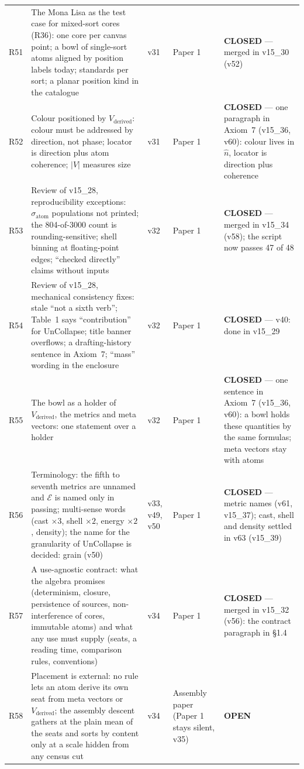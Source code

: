 \documentclass[11pt]{article}
\begin{document}
\begin{longtable}{@{}l R{4.9cm} R{1.5cm} R{2.3cm} R{4.4cm}@{}}
R51 & The Mona Lisa as the test case for mixed-sort cores (R36): one core per canvas point; a bowl of single-sort atoms aligned by position labels today; standards per sort; a planar position kind in the catalogue & v31 & Paper 1 & \textbf{CLOSED} --- merged in v15\_30 (v52) \\
R52 & Colour positioned by $V_{\text{derived}}$: colour must be addressed by direction, not phase; locator is direction plus atom coherence; $|V|$ measures size & v31 & Paper 1 & \textbf{CLOSED} --- one paragraph in Axiom~7 (v15\_36, v60): colour lives in $\hat n$, locator is direction plus coherence \\
R53 & Review of v15\_28, reproducibility exceptions: $\sigma_{\text{atom}}$ populations not printed; the 804-of-3000 count is rounding-sensitive; shell binning at floating-point edges; ``checked directly'' claims without inputs & v32 & Paper 1 & \textbf{CLOSED} --- merged in v15\_34 (v58); the script now passes 47 of 48 \\
R54 & Review of v15\_28, mechanical consistency fixes: stale ``not a sixth verb''; Table~1 says ``contribution'' for UnCollapse; title banner overflows; a drafting-history sentence in Axiom~7; ``mass'' wording in the enclosure & v32 & Paper 1 & \textbf{CLOSED} --- v40: done in v15\_29 \\
R55 & The bowl as a holder of $V_{\text{derived}}$, the metrics and meta vectors: one statement over a holder & v32 & Paper 1 & \textbf{CLOSED} --- one sentence in Axiom~7 (v15\_36, v60): a bowl holds these quantities by the same formulas; meta vectors stay with atoms \\
R56 & Terminology: the fifth to seventh metrics are unnamed and $\mathcal{E}$ is named only in passing; multi-sense words (cast $\times3$, shell $\times2$, energy $\times2$, density); the name for the granularity of UnCollapse is decided: grain (v50) & v33, v49, v50 & Paper 1 & \textbf{CLOSED} --- metric names (v61, v15\_37); cast, shell and density settled in v63 (v15\_39) \\
R57 & A use-agnostic contract: what the algebra promises (determinism, closure, persistence of sources, non-interference of cores, immutable atoms) and what any use must supply (seats, a reading time, comparison rules, conventions) & v34 & Paper 1 & \textbf{CLOSED} --- merged in v15\_32 (v56): the contract paragraph in \S1.4 \\
R58 & Placement is external: no rule lets an atom derive its own seat from meta vectors or $V_{\text{derived}}$; the assembly descent gathers at the plain mean of the seats and sorts by content only at a scale hidden from any census cut & v34 & Assembly paper (Paper 1 stays silent, v35) & \textbf{OPEN} \\

\end{longtable}
\end{document}
